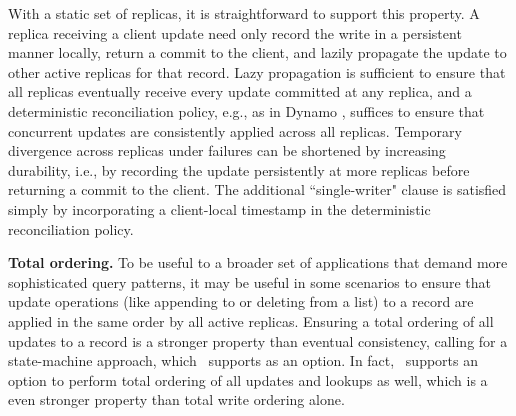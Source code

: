 With a static set of replicas, it is straightforward to support this property. A replica receiving  a client update need only record the write in a persistent manner locally, return a commit to the client, and lazily propagate the update to other active replicas for that record. Lazy propagation is sufficient to ensure that all replicas eventually receive every update committed at any replica, and a deterministic reconciliation policy, e.g., as in Dynamo \cite{dynamo}, suffices to ensure that concurrent updates are consistently applied across all replicas. Temporary divergence across replicas under failures can be shortened by increasing durability, i.e., by recording the update persistently at more replicas before returning a commit to the client. The additional ``single-writer" clause is satisfied simply by incorporating a client-local timestamp in the deterministic reconciliation policy. 



\textbf{Total ordering.} To be useful to a broader set of applications that demand more sophisticated query patterns, it may be useful in some scenarios to ensure that update operations (like appending to or deleting from a list) to a record are applied in the same order by all active replicas. Ensuring a total ordering of all updates to a record is a stronger property than eventual consistency, calling for a state-machine approach, which \auspice\ supports as an option. In fact, \auspice\ supports an option to perform total ordering of all updates and lookups as well, which is a even stronger property than total write ordering alone.


